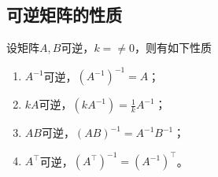 \subsection{可逆矩阵的性质}\label{sec:可逆矩阵的性质}
设矩阵$A,B$可逆，$k=\neq 0$，则有如下性质
\begin{enumerate}[(1)]
    \item $A^{-1}$可逆，$(A^{-1})^{-1} = A$；
    \item $kA$可逆，$(kA^{-1}) = \frac{1}{k} A^{-1}$；
    \item $AB$可逆，$(AB)^{-1} = A^{-1}B^{-1}$；
    \item $A^\intercal$可逆，$(A^\intercal)^{-1} = (A^{-1})^\intercal$。
\end{enumerate}